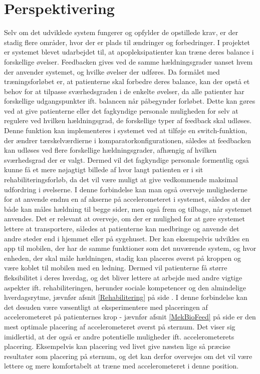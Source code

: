 \section{Perspektivering}
Selv om det udviklede system fungerer og opfylder de opstillede krav, er der stadig flere områder, hvor der er plads til ændringer og forbedringer. 
I projektet er systemet blevet udarbejdet til, at apopleksipatienter kan træne deres balance i forskellige øvelser. Feedbacken gives ved de samme hældningsgrader uanset hvem der anvender systemet, og hvilke øvelser der udføres. Da formålet med træningsforløbet er, at patienterne skal forbedre deres balance, kan der opstå et behov for at tilpasse sværhedsgraden i de enkelte øvelser, da alle patienter har forskellige udgangspunkter ift. balancen når påbegynder forløbet. Dette kan gøres ved at give patienterne eller det fagkyndige personale muligheden for selv at regulere ved hvilken hældningsgrad, de forskellige typer af feedback skal udløses. Denne funktion kan implementeres i systemet ved at tilføje en switch-funktion, der ændrer tærskelværdierne i komparatorkonfigurationen, således at feedbacken kan udløses ved flere forskellige hældningsgrader, afhængig af hvilken sværhedsgrad der er valgt. Dermed vil det fagkyndige personale formentlig også kunne få et mere nøjagtigt billede af hvor langt patienten er i sit rehabiliteringsforløb, da det vil være muligt at give vedkommende maksimal udfordring i øvelserne. I denne forbindelse kan man også overveje mulighederne for at anvende endnu en af akserne på accelerometeret i systemet, således at der både kan måles hældning til begge sider, men også frem og tilbage, når systemet anvendes.
Det er relevant at overveje, om der er mulighed for at gøre systemet lettere at transportere, således at patienterne kan medbringe og anvende det andre steder end i hjemmet eller på sygehuset. Der kan eksempelvis udvikles en app til mobilen, der har de samme funktioner som det nuværende system, og hvor enheden, der skal måle hældningen, stadig kan placeres øverst på kroppen og være koblet til mobilen med en ledning. Dermed vil patienterne få større fleksibilitet i deres hverdag, og det bliver lettere at arbejde med andre vigtige aspekter ift. rehabiliteringen, herunder sociale kompetencer og den almindelige hverdagsrytme, jævnfør afsnit \ref{Rehabilitering} på side \pageref{Rehabilitering}. I denne forbindelse kan det desuden være væsentligt at eksperimentere med placeringen af accelerometeret på patienternes krop - jævnfør afsnit \ref{MekBioFeed} på side \pageref{MekBioFeed} er den mest optimale placering af accelerometeret øverst på sternum. Det viser sig imidlertid, at der også er andre potentielle muligheder ift. accelerometerets placering. Eksempelvis kan placering ved livet give næsten lige så præcise resultater som placering på sternum, og det kan derfor overvejes om det vil være lettere og mere komfortabelt at træne med accelerometeret i denne position\cite{Gjoreski2011}.\\
